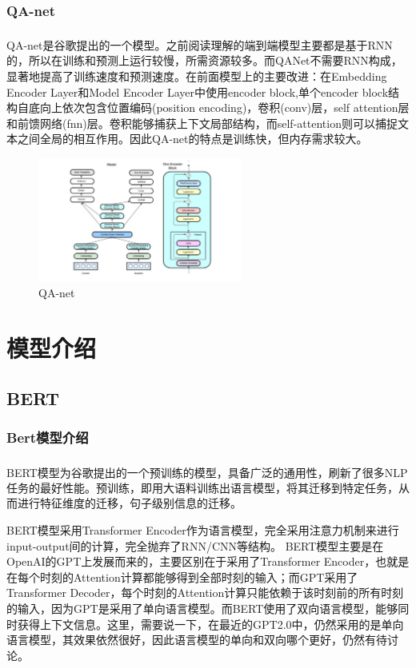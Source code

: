 \documentclass[10pt, a4]{extarticle}
\newcommand{\upcite}[1]{\textsuperscript{\textsuperscript{\cite{#1}}}}
\begin{document}
\subsubsection{QA-net}
QA-net\upcite{qanet}是谷歌提出的一个模型。之前阅读理解的端到端模型主要都是基于RNN的，所以在训练和预测上运行较慢，所需资源较多。而QANet不需要RNN构成，显著地提高了训练速度和预测速度。在前面模型上的主要改进：在Embedding Encoder Layer和Model Encoder Layer中使用encoder block,单个encoder block结构自底向上依次包含位置编码(position encoding)，卷积(conv)层，self attention层和前馈网络(fnn)层。卷积能够捕获上下文局部结构，而self-attention则可以捕捉文本之间全局的相互作用。因此QA-net的特点是训练快，但内存需求较大。

\begin{figure}[H]
	\centering
	\includegraphics[width=0.6\textwidth]{figure/qanet.jpeg}
	\caption{QA-net}
	\label{qanet}
\end{figure}

\section{模型介绍}
\subsection{BERT}
\subsubsection{Bert模型介绍}
BERT模型\upcite{bert}为谷歌提出的一个预训练的模型，具备广泛的通用性，刷新了很多NLP任务的最好性能。预训练，即用大语料训练出语言模型，将其迁移到特定任务，从而进行特征维度的迁移，句子级别信息的迁移。

BERT模型采用Transformer Encoder作为语言模型，完全采用注意力机制来进行input-output间的计算，完全抛弃了RNN/CNN等结构。
BERT模型主要是在OpenAI的GPT上发展而来的，主要区别在于采用了Transformer Encoder，也就是在每个时刻的Attention计算都能够得到全部时刻的输入；而GPT采用了Transformer Decoder，每个时刻的Attention计算只能依赖于该时刻前的所有时刻的输入，因为GPT是采用了单向语言模型。而BERT使用了双向语言模型，能够同时获得上下文信息。这里，需要说一下，在最近的GPT2.0中，仍然采用的是单向语言模型，其效果依然很好，因此语言模型的单向和双向哪个更好，仍然有待讨论。
\end{document}
